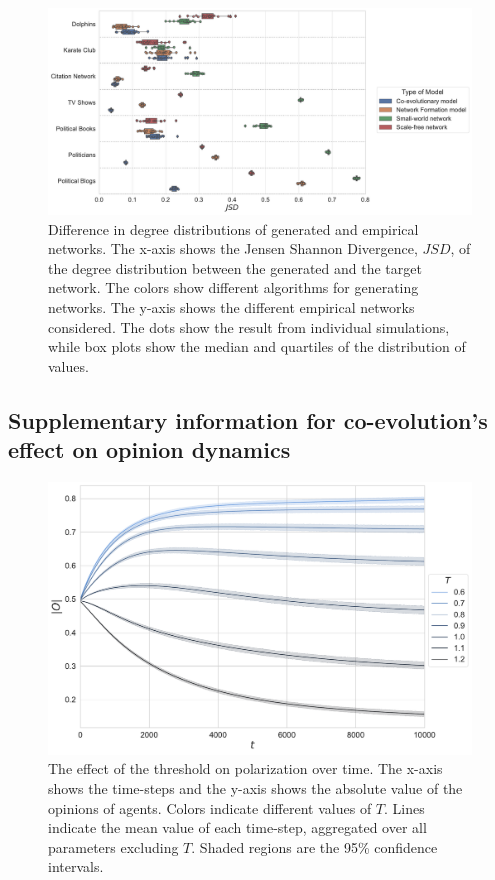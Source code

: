 \documentclass[11pt]{article}
\begin{document}
\begin{figure}[H]
    \centering
    \includegraphics[width=.9\linewidth]{../plots/overall/Model_Evaluation_JSD.pdf}
  \caption{Difference in degree distributions of generated and empirical networks. The x-axis shows the Jensen Shannon Divergence, $JSD$, of the degree distribution between the generated and the target network. The colors show different algorithms for generating networks. The y-axis shows the different empirical networks considered. The dots show the result from individual simulations, while box plots show the median and quartiles of the distribution of values.}
  \label{appendix:eval_divergence}
\end{figure}

\subsection{Supplementary information for co-evolution's effect on opinion dynamics}

\begin{figure}[H]
    \centering
    \includegraphics[width=.7\linewidth]{../plots/overall/Absolute_Opinion_Threshold.pdf}
  \caption{The effect of the threshold on polarization over time. The x-axis shows the time-steps and the y-axis shows the absolute value of the opinions of agents. Colors indicate different values of $T$. Lines indicate the mean value of each time-step, aggregated over all parameters excluding $T$. Shaded regions are the 95\% confidence intervals.}
  \label{appendix:threshold}
\end{figure}
\end{document}
